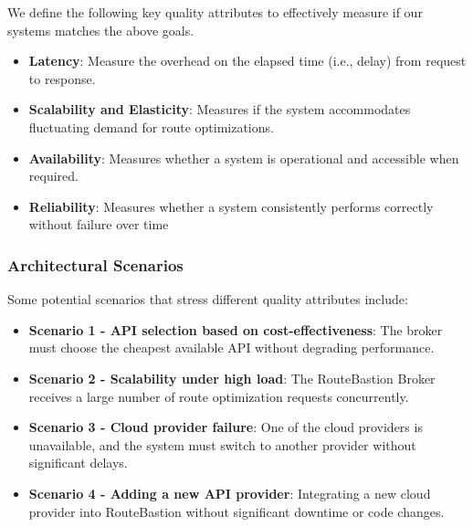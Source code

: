 We define the following key quality attributes to effectively measure if our systems matches the above goals.

\begin{itemize}
     \item \textbf{Latency}: Measure the overhead on the elapsed time (i.e., delay) from request to response.
    \item \textbf{Scalability and Elasticity}: Measures if the system accommodates fluctuating demand for route optimizations.
    \item \textbf{Availability}: Measures whether a system is operational and accessible when required.
     \item \textbf{Reliability}: Measures whether a system consistently performs correctly without failure over time
    
\end{itemize}

\subsubsection{Architectural Scenarios}
\label{subsubsec:architectural_scenarios}

Some potential scenarios that stress different quality attributes include:
\begin{itemize}
    \item \textbf{Scenario 1 - API selection based on cost-effectiveness}: The broker must choose the cheapest available API without degrading performance.

    \item \textbf{Scenario 2 - Scalability under high load}:  The RouteBastion Broker receives a large number of route optimization requests concurrently.
    
    \item \textbf{Scenario 3 - Cloud provider failure}: One of the cloud providers is unavailable, and the system must switch to another provider without significant delays.
    \item \textbf{Scenario 4 - Adding a new API provider}: Integrating a new cloud provider into RouteBastion without significant downtime or code changes.
\end{itemize}

